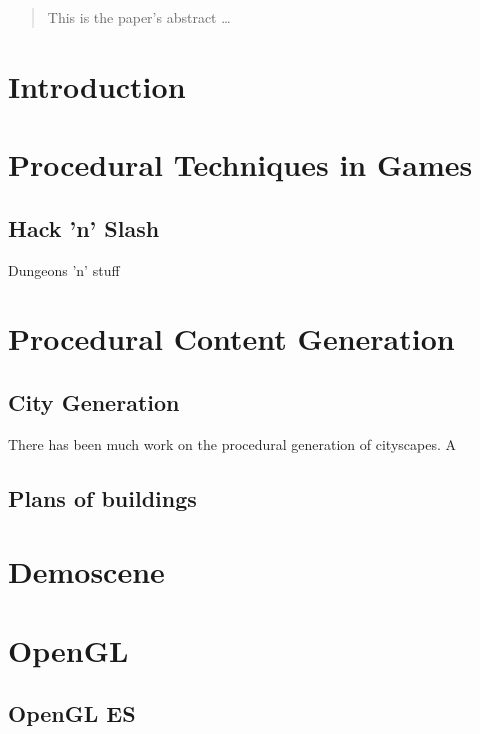 \documentclass[12pt]{article}
\begin{document}
\maketitle

\clearpage

\begin{abstract}
This is the paper's abstract \ldots
\end{abstract}

\clearpage

\section{Introduction}

\section{Procedural Techniques in Games}

\subsection{Hack 'n' Slash}
Dungeons 'n' stuff

\section{Procedural Content Generation}

\subsection{City Generation}
There has been much work on the procedural generation of cityscapes.
A \cite{maim2007populating}

\subsection{Plans of buildings}

\section{Demoscene}

\section{OpenGL}

\subsection{OpenGL ES}
\end{document}
